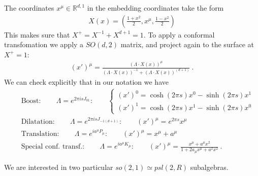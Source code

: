 \documentclass[a4paper,11pt]{article}
\theoremstyle{definition}
\newcommand{\nn}{\nonumber}
\newcommand{\lb}{\left(}
\newcommand{\rb}{\right)}
\begin{document}
The coordinates $x^\mu\in \mathbb{R}^{d,1}$ in the embedding coordinates take the form 
\begin{eqnarray}
    X(x)=\lb \frac{1+x^2}{2},x^\mu, \frac{1-x^2}{2}\rb
\end{eqnarray}
This makes sure that $X^+=X^{-1}+X^{d+1}=1$. To apply a conformal transfomation we apply a $SO(d,2)$ matrix, and project again to the surface at $X^+=1$:
\begin{eqnarray}
    (x')^\mu=\frac{(\Lambda\cdot X(x))^\mu}{(\Lambda\cdot X(x))^{-1}+(\Lambda\cdot X(x))^{(d+1)}}\ .
\end{eqnarray}
We can check explicitly that in our notation we have
\begin{eqnarray}
    &&\text{Boost}:\qquad \Lambda=e^{2\pi i s J_{01}}:\qquad 
\begin{cases}
(x')^0=\cosh(2\pi s)x^0-\sinh(2\pi s)x^1\\
(x')^1=\cosh(2\pi s)x^1-\sinh(2\pi s)x^0
\end{cases}\nn\\
    &&\text{Dilatation}:\qquad \Lambda=e^{2\pi i sJ_{-1(d+1)}}:\qquad (x')^\mu=e^{2\pi s} x^\mu\nn\\
    &&\text{Translation}:\qquad \Lambda=e^{ i a^\mu P_\mu}:\qquad (x')^\mu=x^\mu+a^\mu\nn\\
    &&\text{Special conf. transf.}:\qquad \Lambda=e^{i a^\mu K_\mu}:\qquad (x')^\mu=\frac{x^\mu+a^\mu x^2}{1+2a_\mu x^\mu+a^2 x^2}\ .
\end{eqnarray}

We are interested in two particular $so(2,1)\simeq psl(2,R)$ subalgebras. 
\end{document}
